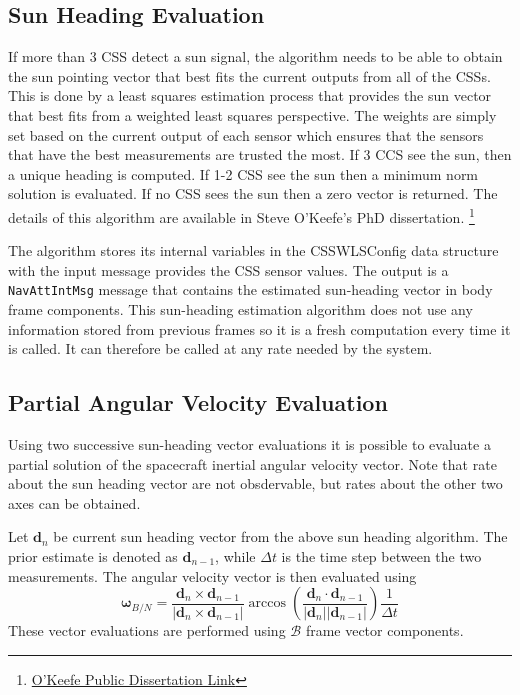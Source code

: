\documentclass[]{BasiliskReportMemo}
\begin{document}
\subsection{Sun Heading Evaluation}
If more than 3 CSS detect a sun signal, the algorithm needs to be able to obtain 
the sun pointing vector that best fits the current outputs from all of the CSSs.  
This is done by a least squares estimation process that provides the sun vector 
that best fits from a weighted least squares perspective.  The weights are 
simply set based on the current output of each sensor which ensures that the 
sensors that have the best measurements are trusted the most.  If 3 CCS see the sun, then a unique heading is computed.  If 1-2 CSS see the sun then a minimum norm solution is evaluated.  If no CSS sees the sun then a zero vector is returned.
The details of 
this algorithm are available in Steve O'Keefe's PhD dissertation. 
\footnote{\href{http://hanspeterschaub.info/Papers/grads/SteveOKeefe.pdf}
   {O'Keefe Public Dissertation Link}}

The algorithm stores its internal variables in the CSSWLSConfig data structure 
with the input message provides the CSS sensor values.  The output is a {\tt NavAttIntMsg} message that contains the estimated sun-heading vector in body frame components.  This 
sun-heading estimation algorithm does not use any information stored from previous frames so it is a 
fresh computation every time it is called.  It can therefore be called at any 
rate needed by the system.


\subsection{Partial Angular Velocity Evaluation}
Using two successive sun-heading vector evaluations it is possible to evaluate a partial solution of the spacecraft inertial angular velocity vector.  Note that rate about the sun heading vector are not obsdervable, but rates about the other two axes can be obtained.  

Let $\bm d_{n}$ be current sun heading vector from the above sun heading algorithm.  The prior estimate is denoted as $\bm d_{n-1}$, while $\Delta t$ is the time step between the two measurements.  The angular velocity vector is then evaluated using
\begin{equation}
	\label{eq:cssEst1}
	\bm\omega_{B/N} = \frac{\bm d_{n} \times \bm d_{n-1}}{|\bm d_{n} \times \bm d_{n-1}|}
	\arccos\left(
		\frac{\bm d_{n} \cdot \bm d_{n-1}}{|\bm d_{n}| |\bm d_{n-1}|} 
	\right) \frac{1}{\Delta t}
\end{equation}
These vector evaluations are performed using $\mathcal{B}$ frame vector components. 
\end{document}
